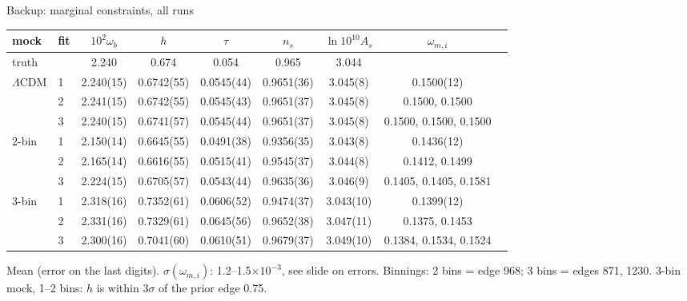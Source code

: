 \documentclass[aspectratio=169,10pt]{beamer}
\newcommand{\lcdm}{$\Lambda$CDM}
\begin{document}
\begin{frame}{Backup: marginal constraints, all runs}
\centering\scriptsize
\setlength{\tabcolsep}{4pt}
\begin{tabular}{@{}llccccccc@{}}
\toprule
mock & fit & $10^2\omega_b$ & $h$ & $\tau$ & $n_s$ & $\ln10^{10}A_s$ & $\omega_{m,i}$ \\
\midrule
truth & & 2.240 & 0.674 & 0.054 & 0.965 & 3.044 & \\
\midrule
\lcdm & 1 & 2.240(15) & 0.6742(55) & 0.0545(44) & 0.9651(36) & 3.045(8) & 0.1500(12) \\
      & 2 & 2.241(15) & 0.6742(55) & 0.0545(43) & 0.9651(37) & 3.045(8) & 0.1500, 0.1500 \\
      & 3 & 2.240(15) & 0.6741(57) & 0.0545(44) & 0.9651(37) & 3.045(8) & 0.1500, 0.1500, 0.1500 \\
\midrule
2-bin & 1 & 2.150(14) & 0.6645(55) & 0.0491(38) & 0.9356(35) & 3.043(8) & 0.1436(12) \\
      & 2 & 2.165(14) & 0.6616(55) & 0.0515(41) & 0.9545(37) & 3.044(8) & 0.1412, 0.1499 \\
      & 3 & 2.224(15) & 0.6705(57) & 0.0543(44) & 0.9635(36) & 3.046(9) & 0.1405, 0.1405, 0.1581 \\
\midrule
3-bin & 1 & 2.318(16) & 0.7352(61) & 0.0606(52) & 0.9474(37) & 3.043(10) & 0.1399(12) \\
      & 2 & 2.331(16) & 0.7329(61) & 0.0645(56) & 0.9652(38) & 3.047(11) & 0.1375, 0.1453 \\
      & 3 & 2.300(16) & 0.7041(60) & 0.0610(51) & 0.9679(37) & 3.049(10) & 0.1384, 0.1534, 0.1524 \\
\bottomrule
\end{tabular}

\vspace{0.5em}
{\scriptsize Mean (error on the last digits). $\sigma(\omega_{m,i})$: 1.2--1.5$\times10^{-3}$, see slide on errors.
Binnings: 2 bins = edge 968; 3 bins = edges 871, 1230. 3-bin mock, 1--2 bins: $h$ is within $3\sigma$ of the prior edge 0.75.}
\end{frame}
\end{document}

